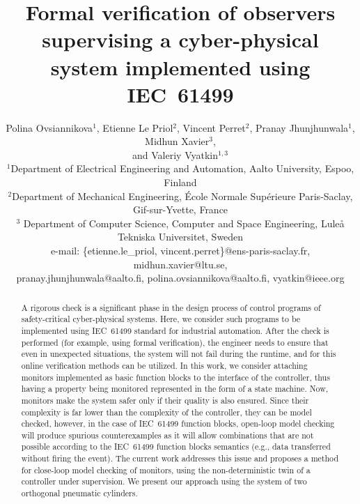 \documentclass[conference]{IEEEtran}
\title{Formal verification of observers supervising a cyber-physical system implemented using IEC~61499}
\author{ Polina Ovsiannikova$^{1}$, Etienne Le Priol$^{2}$, Vincent Perret$^{2}$, Pranay Jhunjhunwala$^{1}$, Midhun Xavier$^{3}$, \\ 
and Valeriy Vyatkin$^{1,3}$ \\

 \normalsize $^{1}$Department of Electrical Engineering and Automation, Aalto University, Espoo, Finland\\

 \normalsize $^{2}$Department of Mechanical Engineering, École Normale Supérieure Paris-Saclay, Gif-sur-Yvette, France \\

\normalsize$^{3}$ Department of Computer Science, Computer and Space Engineering,
Luleå Tekniska Universitet, Sweden \\

 \normalsize e-mail: \{etienne.le\_priol, vincent.perret\}@ens-paris-saclay.fr, midhun.xavier@ltu.se,\\
 pranay.jhunjhunwala@aalto.fi, polina.ovsiannikova@aalto.fi, vyatkin@ieee.org
}
\begin{document}
\maketitle


\begin{abstract}
A rigorous check is a significant phase in the design process of control programs of safety-critical cyber-physical systems. Here, we consider such programs to be implemented using IEC~61499 standard for industrial automation. After the check is performed (for example, using formal verification), the engineer needs to ensure that even in unexpected situations, the system will not fail during the runtime, and for this online verification methods can be utilized.
In this work, we consider attaching monitors implemented as basic function blocks to the interface of the controller, thus having a property being monitored represented in the form of a state machine. Now, monitors make the system safer only if their quality is also ensured. Since their complexity is far lower than the complexity of the controller, they can be model checked, however, in the case of IEC~61499 function blocks, open-loop model checking will produce spurious counterexamples as it will allow combinations that are not possible according to the IEC~61499 function blocks semantics (e.g., data transferred without firing the event). The current work addresses this issue and proposes a method for close-loop model checking of monitors, using the non-deterministic twin of a controller under supervision. We present our approach using the system of two orthogonal pneumatic cylinders.

\end{abstract}
\end{document}
